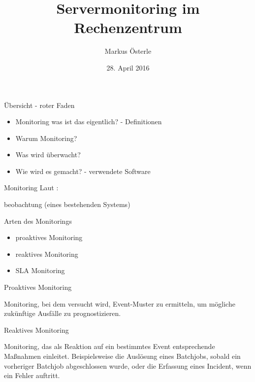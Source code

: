\documentclass[12pt]{beamer}              %
\author{Markus Österle}
\title{Servermonitoring im Rechenzentrum}
\date{28. April 2016}
\begin{document}
\begin{frame}
\titlepage
\end{frame}


\begin{frame}{Übersicht - roter Faden}
\begin{itemize}
	\item Monitoring was ist das eigentlich? - Definitionen
	\item Warum Monitoring?
	\item Was wird überwacht?
	\item Wie wird es gemacht? - verwendete Software
\end{itemize}
\end{frame}
\begin{frame}{Monitoring}
	Laut \cite[S. 701; Stichwort Monitoring]{duden}: \\
	
	\begin{center}
		\glqq [Dauer]beobachtung (eines bestehenden Systems)\grqq
	\end{center}
	
\end{frame}
\begin{frame}{Arten des Monitorings}
	\begin{itemize}
		\item proaktives Monitoring
		\item reaktives Monitoring
		\item SLA Monitoring
	\end{itemize}
\end{frame}
\begin{frame}{Proaktives Monitoring}
	\begin{center}
		Monitoring, bei dem versucht wird, Event-Muster zu ermitteln, um mögliche zukünftige Ausfälle zu prognostizieren.
	\end{center}
	 
\end{frame}
\begin{frame}{Reaktives Monitoring}
	\begin{center}
		Monitoring, das als Reaktion auf ein bestimmtes Event entsprechende Maßnahmen einleitet. Beispielsweise die Auslösung eines Batchjobs, sobald ein vorheriger Batchjob abgeschlossen wurde, oder die Erfassung eines Incident, wenn ein Fehler auftritt. 
	\end{center}
\end{frame}
\end{document}
